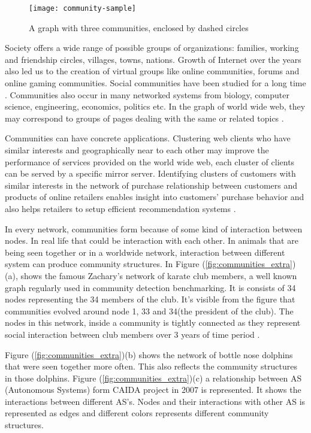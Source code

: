 \vfill
\pagebreak

\begin{figure}[H]
	\centering
	\texttt{[image: community-sample]}
	\caption{A graph with three communities, enclosed by dashed circles}
	\label{fig:community}
\end{figure}

Society offers a wide range of possible groups of organizations: families, working and friendship circles, villages, towns, nations. Growth of Internet over the years also led us to the creation of virtual groups like online communities, forums and online gaming communities. Social communities have been studied for a long time \cite{ref-6}. Communities also occur in many networked systems from biology, computer science, engineering, economics, politics etc. In the graph of world wide web, they may correspond to groups of pages dealing with the same or related topics \cite{ref-36}.

Communities can have concrete applications. Clustering web clients who have similar interests and geographically near to each other may improve the performance of services provided on the world wide web, each cluster of clients can be served by a specific mirror server. Identifying clusters of customers with similar interests in the network of purchase relationship between customers and products of online retailers enables insight into customers' purchase behavior and also helps retailers to setup efficient recommendation systems \cite{ref-37}.

In every network, communities form because of some kind of interaction between nodes. In real life that could be interaction with each other. In animals that are being seen together or in a worldwide network, interaction between different system can produce community structures. In Figure (\ref{fig:communities_extra})(a), shows the famous Zachary's network of karate club members, a well known graph regularly used in community detection benchmarking. It is consists of 34 nodes representing the 34 members of the club. It's visible from the figure that communities evolved around node 1, 33 and 34(the president of the club). The nodes in this network, inside a community is tightly connected as they represent social interaction between club members over 3 years of time period \cite{ref-58}.

Figure (\ref{fig:communities_extra})(b) shows the network of bottle nose dolphins that were seen together more often. This also reflects the community structures in those dolphins. Figure (\ref{fig:communities_extra})(c) a relationship between AS (Autonomous Systems) form CAIDA project in 2007 is represented. It shows the interactions between different AS's. Nodes and their interactions with other AS is represented as edges and different colors represents different community structures.

